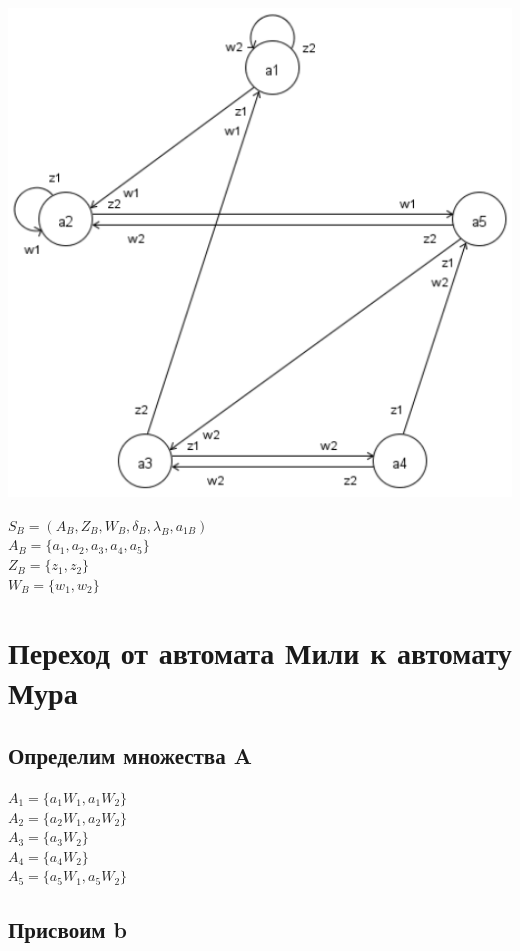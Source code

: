 \documentclass[12pt, a4paper]{article}
\begin{document}
\begin{center}
\includegraphics[scale=2.0]{input-graph}\\
\end{center}

\noindent $S_B = (A_B, Z_B, W_B, \delta_B, \lambda_B, a_{1B})$\\
$A_B = \{a_1, a_2, a_3, a_4, a_5\}$\\
$Z_B = \{z_1, z_2\}$\\
$W_B = \{w_1, w_2\}$\\

\section*{Переход от автомата Мили к автомату Мура}

\subsection*{Определим множества A}

\noindent $A_1 = \{a_1W_1, a_1W_2\}$\\
$A_2 = \{a_2W_1, a_2W_2\}$\\
$A_3 = \{a_3W_2\}$\\
$A_4 = \{a_4W_2\}$\\
$A_5 = \{a_5W_1, a_5W_2\}$

\subsection*{Присвоим b}
\end{document}
